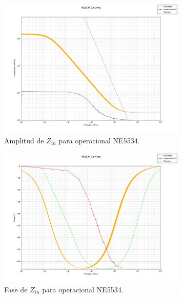 \begin{figure}[H]
    \begin{minipage}{\textwidth}
        \centering
        \includegraphics[width=0.8\textwidth]{../EJ2/recursos_para_el_informe/NE5534_Zin_Amp}
        \caption{Amplitud de $Z_{in}$ para operacional NE5534.}
        \label{fig:NE5534_Zin_Amp}
    \end{minipage}\hfill
\end{figure}
\begin{figure}[H]
    \begin{minipage}{\textwidth}
        \centering
        \includegraphics[width=0.8\textwidth]{../EJ2/recursos_para_el_informe/NE5534_Zin_Fase}
        \caption{Fase de $Z_{in}$ para operacional NE5534.}
        \label{fig:NE5534_Zin_Fase}
    \end{minipage}\hfill
\end{figure}